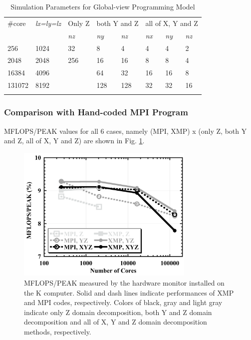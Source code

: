 \documentclass[graybox]{svmult}
\begin{document}
\begin{table}[h]
\caption{Simulation Parameters for Global-view Programming Model}
\label{tab6-1}
\begin{tabular}{p{2cm}p{2cm}p{1.5cm}p{1cm}p{1.5cm}p{1cm}p{1cm}p{1cm}}
\hline\noalign{\smallskip}
\#core & {\it lx=ly=lz} & Only Z & \multicolumn{2}{l}{both Y and Z}  & \multicolumn{3}{l}{all of X, Y and Z} \\
\cline{3-8}
 & & {\it nz} &  {\it ny} & {\it nz} & {\it nx} & {\it ny} & {\it nz} \\
\noalign{\smallskip}\svhline\noalign{\smallskip}
256 & 1024 & 32 & 8 & 4 & 4 & 4 & 2 \\
2048 & 2048 & 256 & 16 & 16 & 8 & 8 & 4 \\
16384 & 4096 & & 64 & 32 & 16 & 16 & 8 \\
131072 & 8192 & & 128 & 128 & 32 & 32 & 16  \\
\noalign{\smallskip}\hline\noalign{\smallskip}
\end{tabular}
\end{table}

\subsubsection{Comparison with Hand-coded MPI Program}
MFLOPS/PEAK values for all 6 cases, namely (MPI, XMP) x (only Z, both Y and Z, all of X, Y and Z) are shown in Fig. \ref{fig6-2}.

\begin{figure}[h]
\begin{center}
\includegraphics[width=8.5cm,bb=0 0 459 352]{fig6-2.png}
\end{center}
\caption{MFLOPS/PEAK measured by the hardware monitor installed on the K computer. Solid and dash lines indicate performances of  XMP and MPI codes, respectively. Colors of black, gray and light gray indicate only Z domain decomposition, both Y and Z domain decomposition and all of X, Y and Z domain decomposition methods, respectively.}
\label{fig6-2} 
\end{figure}
\end{document}
